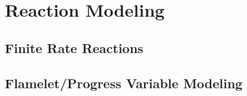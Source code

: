 \section{Reaction Modeling}

\subsection{Finite Rate Reactions}

\subsection{Flamelet/Progress Variable Modeling}
